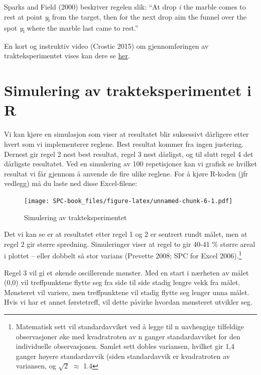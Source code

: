 \documentclass[
]{book}
\begin{document}
Sparks and Field (2000) beskriver regelen slik: ``At drop \emph{i} the marble comes to rest at point \emph{y}\textsubscript{i} from the target, then for the next drop aim the funnel over the spot \emph{y}\textsubscript{i} where the marble last came to rest.''

En kort og instruktiv video (Crostic 2015) om gjennomføringen av trakteksperimentet vises kan dere se \href{https://www.youtube.com/watch?v=t5DV69_2VeQ\&ab_channel=MichaelCrostic}{her}.

\hypertarget{simulering-av-trakteksperimentet-i-r}{%
\section{Simulering av trakteksperimentet i R}\label{simulering-av-trakteksperimentet-i-r}}

Vi kan kjøre en simulasjon som viser at resultatet blir suksessivt dårligere etter hvert som vi implementerer reglene. Best resultat kommer fra ingen justering. Dernest gir regel 2 nest best resultat, regel 3 nest dårligst, og til slutt regel 4 det dårligste resultatet. Ved en simulering av 100 repetisjoner kan vi grafisk se hvilket resultat vi får gjennom å anvende de fire ulike reglene. For å kjøre R-koden (jfr vedlegg) må du laste ned disse Excel-filene:

\begin{figure}
\centering
\texttt{[image: SPC-book\_files/figure-latex/unnamed-chunk-6-1.pdf]}
\caption{\label{fig:unnamed-chunk-6}Simulering av trakteksperimentet}
\end{figure}

Det vi kan se er at resultatet etter regel 1 og 2 er sentrert rundt målet, men at regel 2 gir større spredning. Simuleringer viser at regel to gir 40-41 \% større areal i plottet -- eller dobbelt så stor varians (Prevette 2008; SPC for Excel 2006).\footnote{Matematisk sett vil standardavviket ved å legge til n uavhengige tilfeldige observasjoner øke med kvadratroten av n ganger standardavviket for den individuelle observasjonen. Samlet sett dobles variansen, hvilket gir 1,4 ganger høyere standardavvik (siden standardavvik er kvadratroten av variansen, og \(\sqrt{2}\) \(\approx\) 1.4}

Regel 3 vil gi et økende oscillerende mønster. Med en start i nærheten av målet (0,0) vil treffpunktene flytte seg fra side til side stadig lengre vekk fra målet. Mønsteret vil variere, men treffpunktene vil stadig flytte seg lenger unna målet. Hvis vi har et annet førstetreff, vil dette påvirke hvordan mønsteret utvikler seg.
\end{document}
